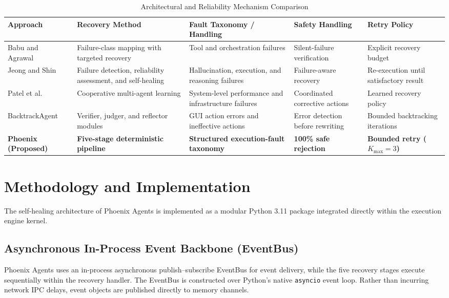 \documentclass[conference]{IEEEtran}
\begin{document}
\begin{table}[t]
\centering
\caption{Architectural and Reliability Mechanism Comparison}
\label{tab:system_comparison}
\footnotesize
\begin{tabularx}{\textwidth}{p{}p{}p{}p{}X}
\toprule
\textbf{Approach} & \textbf{Recovery Method} & \textbf{Fault Taxonomy / Handling} & \textbf{Safety Handling} & \textbf{Retry Policy} \\
\midrule
Babu and Agrawal~\cite{babu2026} & Failure-class mapping with targeted recovery & Tool and orchestration failures & Silent-failure verification & Explicit recovery budget \\
Jeong and Shin~\cite{jeong2026} & Failure detection, reliability assessment, and self-healing & Hallucination, execution, and reasoning failures & Failure-aware recovery & Re-execution until satisfactory result \\
Patel et al.~\cite{patel2026b} & Cooperative multi-agent learning & System-level performance and infrastructure failures & Coordinated corrective actions & Learned recovery policy \\
BacktrackAgent~\cite{wu2025} & Verifier, judger, and reflector modules & GUI action errors and ineffective actions & Error detection before rewriting & Bounded backtracking iterations \\
\textbf{Phoenix (Proposed)} & \textbf{Five-stage deterministic pipeline} & \textbf{Structured execution-fault taxonomy} & \textbf{100\% safe rejection} & \textbf{Bounded retry ($K_{\text{max}} = 3$)} \\
\bottomrule
\end{tabularx}
\end{table}

\section{Methodology and Implementation}
The self-healing architecture of Phoenix Agents is implemented as a modular Python 3.11 package integrated directly within the execution engine kernel.

\subsection{Asynchronous In-Process Event Backbone (EventBus)}
Phoenix Agents uses an in-process asynchronous publish--subscribe EventBus for event delivery, while the five recovery stages execute sequentially within the recovery handler. The EventBus is constructed over Python's native \texttt{asyncio} event loop. Rather than incurring network IPC delays, event objects are published directly to memory channels.
\end{document}
